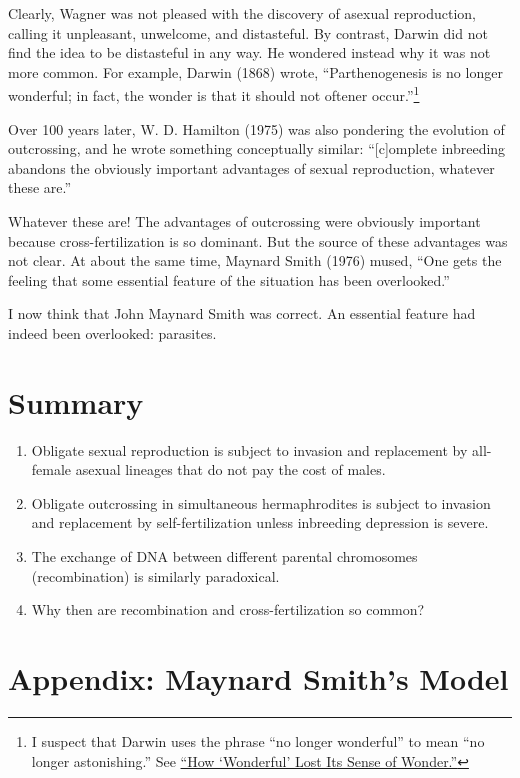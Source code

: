\documentclass[
  letterpaper,
]{book}
\providecommand{\tightlist}{%
  \setlength{\itemsep}{0pt}\setlength{\parskip}{0pt}}\usepackage{longtable,booktabs,array}
\begin{document}
Clearly, Wagner was not pleased with the discovery of asexual
reproduction, calling it unpleasant, unwelcome, and distasteful. By
contrast, Darwin did not find the idea to be distasteful in any way. He
wondered instead why it was not more common. For example, Darwin (1868)
wrote, ``Parthenogenesis is no longer wonderful; in fact, the wonder is
that it should not oftener occur.''\footnote{I suspect that Darwin uses
  the phrase ``no longer wonderful'' to mean ``no longer astonishing.''
  See
  \href{https://www.merriam-webster.com/words-at-play/wonderful-word-history-evolution}{``How
  `Wonderful' Lost Its Sense of Wonder.''}}

Over 100 years later, W. D. Hamilton (1975) was also pondering the
evolution of outcrossing, and he wrote something conceptually similar:
``{[}c{]}omplete inbreeding abandons the obviously important advantages
of sexual reproduction, whatever these are.''

Whatever these are! The advantages of outcrossing were obviously
important because cross-fertilization is so dominant. But the source of
these advantages was not clear. At about the same time, Maynard Smith
(1976) mused, ``One gets the feeling that some essential feature of the
situation has been overlooked.''

I now think that John Maynard Smith was correct. An essential feature
had indeed been overlooked: parasites.

\section{Summary}\label{summary}

\begin{enumerate}
\def\labelenumi{\arabic{enumi}.}
\tightlist
\item
  Obligate sexual reproduction is subject to invasion and replacement by
  all-female asexual lineages that do not pay the cost of males.
\item
  Obligate outcrossing in simultaneous hermaphrodites is subject to
  invasion and replacement by self-fertilization unless inbreeding
  depression is severe.
\item
  The exchange of DNA between different parental chromosomes
  (recombination) is similarly paradoxical.
\item
  Why then are recombination and cross-fertilization so common?
\end{enumerate}

\section{Appendix: Maynard Smith's Model}\label{sec-app-1}
\end{document}
